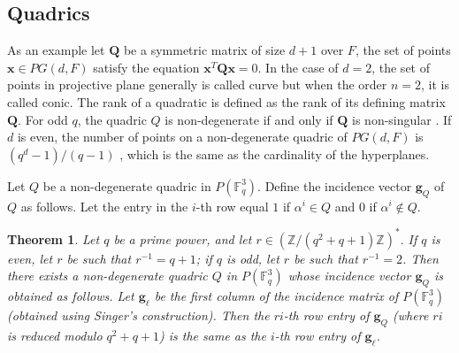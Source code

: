 \documentclass[journal,comsoc]{IEEEtran}
\newtheorem{theorem}{Theorem}[section]
\begin{document}
\subsection{Quadrics}
\label{quadrics}
\iffalse We shall need to make use of objects from projective geometry called non-degenerate quadrics. \fi
\iffalse 
Recall that a hypersurface $V^n_{d-1}$, of order $n$, in $PG(d, F)$ is the set of points denoted as a vector $\mathbf{x} = [x_0, x_1, \dots,x_d]^T$ satisfying
\begin{equation}
    f(\mathbf{x}) =0,
\end{equation}
\noindent where $PG(d, F)$ is a projective space of dimension $d$ over the field $F$\iffalse, $F$ is any field (e.g., $F = \mathbb{F}, \mathbb{C}$ etc.)\fi, and $f(\cdot)$ is a non-zero homogeneous polynomial of degree $n$. When the order $n$ is equal to $2$, a hypersurface is called a quadric denoted by the symbol $Q$. \fi \iffalse As an example let $\mathbf{Q}$ be a symmetric matrix of size $d+1$ over $F$, the set of points $\mathbf{x} \in PG(d, F)$ satisfy the equation $\mathbf{x}^T \mathbf{Q} \mathbf{x} =0$. In the case of $d = 2$, the set of points in projective plane generally is called curve but when the order $n = 2$, it is called conic. The rank of a quadratic is defined as the rank of its defining matrix $\mathbf{Q}$. For odd $q$, the quadric $Q$ is non-degenerate if and only if $\mathbf{Q}$ is non-singular \cite{Hirschfeld1998}.  If $d$ is even, the number of points on a non-degenerate quadric of $PG(d, F)$ is $(q^d-1)/(q-1)$ \cite{Hirschfeld1998}, which is the same as the cardinality of the hyperplanes. \fi

Let $Q$ be a non-degenerate quadric in $P(\mathbb{F}_q^3)$. Define the incidence vector $\mathbf{g}_Q$ of $Q$ as follows. Let the entry in the $i$-th row equal $1$ if $\alpha^i \in Q$ and $0$ if $\alpha^i \not\in Q$.
\iffalse 
The following theorem provides a straightforward construction of the non-degenerate quadrics in projective planes. It is a version of a result that was \iffalse first\fi proven by Arasu \emph{et al.}\! in\! \cite{Arasu1995}. \fi
\begin{theorem} \cite{Arasu1995} Let $q$ be a prime power, and let $r \in (\mathbb{Z}/(q^2+q+1)\mathbb{Z})^*.$ If $q$ is even, let $r$ be such that $r^{-1} = q+1$; if $q$ is odd, let $r$ be such that $r^{-1} = 2$. Then there exists a non-degenerate quadric $Q$ in $P(\mathbb{F}_q^3)$ whose incidence vector $\mathbf{g}_Q$ is obtained as follows. Let $\mathbf{g}_{\ell}$ be the first column of the incidence matrix of $P(\mathbb{F}_q^3)$ (obtained using Singer's construction). Then the $ri$-th row entry of $\mathbf{g}_Q$ (where $ri$ is reduced modulo $q^2+q+1$) is the same as the $i$-th row entry of $\mathbf{g}_{\ell}$.
\end{theorem} \iffalse
Note that, in particular, this result implies that the non-degenerate quadric under consideration has the same number of points as a line in the projective plane. We shall use the result of Arasu \emph{et al.} to construct incidence vectors of non-degenerate quadrics in $P(\mathbb{F}_2^3)$ and in $P(\mathbb{F}_3^3)$. \fi
\end{document}
